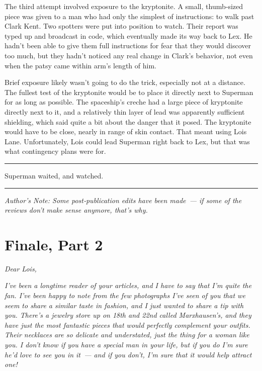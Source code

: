 \documentclass[ebook,12pt]{memoir}
\begin{document}
The third attempt involved exposure to the kryptonite. A small,
thumb‐sized piece was given to a man who had only the simplest of
instructions: to walk past Clark Kent. Two spotters were put into
position to watch. Their report was typed up and broadcast in code,
which eventually made its way back to Lex. He hadn't been able to give
them full instructions for fear that they would discover too much, but
they hadn't noticed any real change in Clark's behavior, not even when
the patsy came within arm's length of him.

Brief exposure likely wasn't going to do the trick, especially not at a
distance. The fullest test of the kryptonite would be to place it
directly next to Superman for as long as possible. The spaceship's
creche had a large piece of kryptonite directly next to it, and a
relatively thin layer of lead was apparently sufficient shielding, which
said quite a bit about the danger that it posed. The kryptonite would
have to be close, nearly in range of skin contact. That meant using Lois
Lane. Unfortunately, Lois could lead Superman right back to Lex, but
that was what contingency plans were for.

\begin{center}\rule{0.5\linewidth}{0.5pt}\end{center}

Superman waited, and watched.

\begin{center}\rule{0.5\linewidth}{0.5pt}\end{center}

\emph{Author's Note: Some post‐publication edits have been made~--- if
some of the reviews don't make sense anymore, that's why.}



\hypertarget{finale-part-2}{%
\chapter{Finale, Part 2}\label{finale-part-2}}

\emph{Dear Lois,}

\emph{I've been a longtime reader of your articles, and I have to say
that I'm quite the fan. I've been happy to note from the few photographs
I've seen of you that we seem to share a similar taste in fashion, and I
just wanted to share a tip with you. There's a jewelry store up on 18th
and 22nd called Marxhausen's, and they have just the most fantastic
pieces that would perfectly complement your outfits. Their necklaces are
so delicate and understated, just the thing for a woman like you. I
don't know if you have a special man in your life, but if you do I'm
sure he'd love to see you in it~--- and if you don't, I'm sure that it
would help attract one!}
\end{document}

